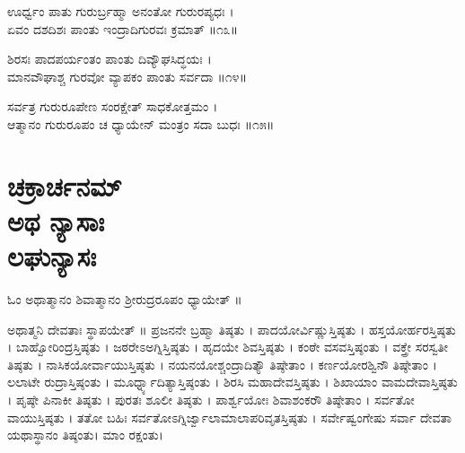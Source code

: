ಊರ್ಧ್ವಂ ಪಾತು ಗುರುರ್ಬ್ರಹ್ಮಾ ಅನಂತೋ ಗುರುರಪ್ಯಧಃ ।\\
ಏವಂ ದಶದಿಶಃ ಪಾಂತು ಇಂದ್ರಾದಿಗುರವಃ ಕ್ರಮಾತ್ ॥೧೩॥

ಶಿರಸಃ ಪಾದಪರ್ಯಂತಂ ಪಾಂತು ದಿವ್ಯೌಘಸಿದ್ಧಯಃ ।\\
ಮಾನವೌಘಾಶ್ಚ ಗುರವೋ ವ್ಯಾಪಕಂ ಪಾಂತು ಸರ್ವದಾ ॥೧೪॥

ಸರ್ವತ್ರ ಗುರುರೂಪೇಣ ಸಂರಕ್ಷೇತ್ ಸಾಧಕೋತ್ತಮಂ ।\\
ಆತ್ಮಾನಂ ಗುರುರೂಪಂ ಚ ಧ್ಯಾಯೇನ್ ಮಂತ್ರಂ ಸದಾ ಬುಧಃ ॥೧೫॥

\thispagestyle{empty}
\section{ ಚಕ್ರಾರ್ಚನಮ್\\ಅಥ ನ್ಯಾಸಾಃ\\ಲಘುನ್ಯಾಸಃ}
ಓಂ ಅಥಾತ್ಮಾನಂ ಶಿವಾತ್ಮಾನಂ ಶ್ರೀರುದ್ರರೂಪಂ ಧ್ಯಾಯೇತ್ ॥

ಅಥಾತ್ಮನಿ ದೇವತಾಃ ಸ್ಥಾಪಯೇತ್ ॥
\newpage
ಪ್ರಜನನೇ ಬ್ರಹ್ಮಾ ತಿಷ್ಠತು । ಪಾದಯೋರ್ವಿಷ್ಣುಸ್ತಿಷ್ಠತು । ಹಸ್ತಯೋರ್ಹರಸ್ತಿಷ್ಠತು । ಬಾಹ್ವೋರಿಂದ್ರಸ್ತಿಷ್ಠತು । ಜಠರೇಽಅಗ್ನಿಸ್ತಿಷ್ಠತು । ಹೃದಯೇ ಶಿವಸ್ತಿಷ್ಠತು । ಕಂಠೇ ವಸವಸ್ತಿಷ್ಠಂತು । ವಕ್ತ್ರೇ ಸರಸ್ವತೀ ತಿಷ್ಠತು । ನಾಸಿಕಯೋರ್ವಾಯುಸ್ತಿಷ್ಠತು । ನಯನಯೋಶ್ಚಂದ್ರಾದಿತ್ಯೌ ತಿಷ್ಠೇತಾಂ । ಕರ್ಣಯೋರಶ್ವಿನೌ ತಿಷ್ಠೇತಾಂ । ಲಲಾಟೇ ರುದ್ರಾಸ್ತಿಷ್ಠಂತು । ಮೂರ್ಧ್ನ್ಯಾದಿತ್ಯಾಸ್ತಿಷ್ಠಂತು । ಶಿರಸಿ ಮಹಾದೇವಸ್ತಿಷ್ಠತು । ಶಿಖಾಯಾಂ ವಾಮದೇವಾಸ್ತಿಷ್ಠತು । ಪೃಷ್ಠೇ ಪಿನಾಕೀ ತಿಷ್ಠತು । ಪುರತಃ ಶೂಲೀ ತಿಷ್ಠತು । ಪಾರ್ಶ್ವಯೋಃ ಶಿವಾಶಂಕರೌ ತಿಷ್ಠೇತಾಂ । ಸರ್ವತೋ ವಾಯುಸ್ತಿಷ್ಠತು । ತತೋ ಬಹಿಃ ಸರ್ವತೋಽಗ್ನಿರ್ಜ್ವಾಲಾಮಾಲಾಪರಿವೃತಸ್ತಿಷ್ಠತು । ಸರ್ವೇಷ್ವಂಗೇಷು ಸರ್ವಾ ದೇವತಾ ಯಥಾಸ್ಥಾನಂ ತಿಷ್ಠಂತು। ಮಾಂ ರಕ್ಷಂತು।

